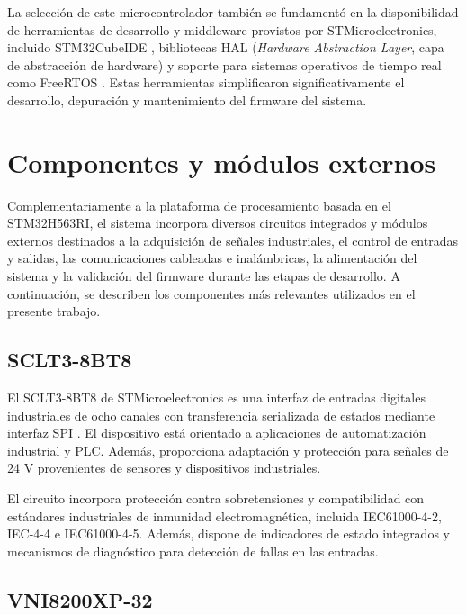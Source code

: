 La selección de este microcontrolador también se fundamentó en la disponibilidad de herramientas de desarrollo y middleware provistos por STMicroelectronics, incluido STM32CubeIDE \cite{stm32cubeide}, bibliotecas HAL (\textit{Hardware Abstraction Layer}, capa de abstracción de hardware) \cite{hal} y soporte para sistemas operativos de tiempo real como FreeRTOS \cite{freertos}. Estas herramientas simplificaron significativamente el desarrollo, depuración y mantenimiento del firmware del sistema.


\section{Componentes y módulos externos}

Complementariamente a la plataforma de procesamiento basada en el STM32H\-563RI, el sistema incorpora diversos circuitos integrados y módulos externos destinados a la adquisición de señales industriales, el control de entradas y salidas, las comunicaciones cableadas e inalámbricas, la alimentación del sistema y la validación del firmware durante las etapas de desarrollo. A continuación, se describen los componentes más relevantes utilizados en el presente trabajo.

\subsection{SCLT3-8BT8}

El SCLT3-8BT8 de STMicroelectronics es una interfaz de entradas digitales industriales de ocho canales con transferencia serializada de estados mediante interfaz SPI \cite{sclt38bt8}. El dispositivo está orientado a aplicaciones de automatización industrial y PLC. Además, proporciona adaptación y protección para señales de 24 V provenientes de sensores y dispositivos industriales.

El circuito incorpora protección contra sobretensiones y compatibilidad con estándares industriales de inmunidad electromagnética, incluida IEC61000-4-2, IEC-4-4 e IEC61000-4-5. Además, dispone de indicadores de estado integrados y mecanismos de diagnóstico para detección de fallas en las entradas.

\subsection{VNI8200XP-32}

